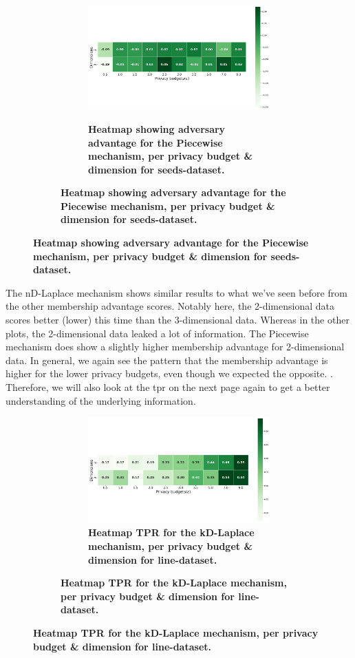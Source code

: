 {\begin{figure}[H]
\begin{subfigure}[b]{0.80\textwidth}
    \begin{subfigure}[c]{1\textwidth}
      \caption{\textbf{Heatmap showing adversary advantage for the Piecewise mechanism, per privacy budget \& dimension for seeds-dataset.}}
      \includegraphics[width=1\textwidth]{Results/nd-laplace/piecewise/line-dataset/attack_adv.png}
      \label{fig:privacy_line-dataset_adversial_advantage_piecewise}
    \end{subfigure}
  \end{subfigure}
\end{figure}
The nD-Laplace mechanism shows similar results to what we've seen before from the other membership advantage scores. Notably here, the 2-dimensional data scores better (lower) this time than the 3-dimensional data. Whereas in the other plots, the 2-dimensional data leaked a lot of information.
The Piecewise mechanism does show a slightly higher membership advantage for 2-dimensional data.
In general, we again see the pattern that the membership advantage is higher for the lower privacy budgets, even though we expected the opposite.
.
Therefore, we will also look at the \gls{tpr} on the next page again to get a better understanding of the underlying information.
\newpage
\begin{figure}[H]
    \centering
    \begin{subfigure}[b]{0.9\textwidth}
        \begin{subfigure}[c]{1\textwidth}
            \caption{\textbf{Heatmap TPR for the kD-Laplace mechanism, per privacy budget \& dimension for line-dataset.}}
            \includegraphics[width=1\textwidth]{Results/nd-laplace/nd-Laplace/line-dataset/tpr.png}

\end{subfigure}
\end{subfigure}
\end{figure}}
